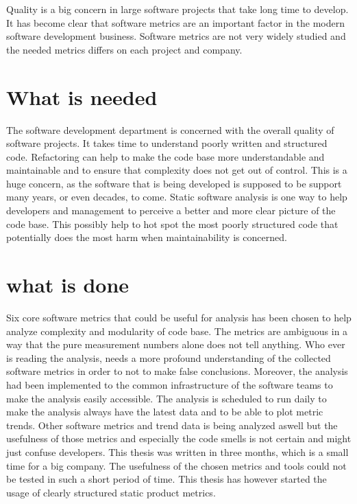 Quality is a big concern in large software projects that take long time to develop.
It has become clear that software metrics are an important factor in the modern software development business. Software metrics are not very widely studied and the needed metrics differs on each project and company. 

\section{What is needed}

The software development department is concerned with the overall quality of software projects. It takes time to understand poorly written and structured code. Refactoring can help to make the code base more understandable and maintainable and to ensure that complexity does not get out of control. This is a huge concern, as the software that is being developed is supposed to be support many years, or even decades, to come. Static software analysis is one way to help developers and management to perceive a better and more clear picture of the code base. This possibly help to hot spot the most poorly structured code that potentially does the most harm when maintainability is concerned.

\section{what is done}

Six core software metrics that could be useful for analysis has been chosen to help analyze complexity and modularity of code base. The metrics are ambiguous in a way that the pure measurement numbers alone does not tell anything. Who ever is reading the analysis, needs a more profound understanding of the collected software metrics in order to not to make false conclusions. Moreover, the analysis had been implemented to the common infrastructure of the software teams to make the analysis easily accessible. The analysis is scheduled to run daily to make the analysis always have the latest data and to be able to plot metric trends. Other software metrics and trend data is being analyzed aswell but the usefulness of those metrics and especially the code smells is not certain and might just confuse developers. This thesis was written in three months, which is a small time for a big company. The usefulness of the chosen metrics and tools could not be tested in such a short period of time. This thesis has however started the usage of clearly structured static product metrics.

